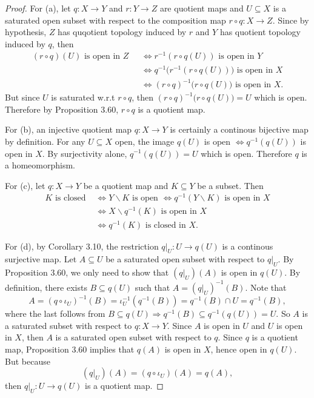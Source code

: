 \documentclass[a4paper]{article}
\theoremstyle{remark}
\newcommand{\subhim}{\subseteq} %
\begin{document}
\begin{proof}
	For (a), let $q : X \to Y$ and $r : Y \to Z$ are quotient maps and $U\subhim X$ is a saturated open subset with respect to the composition map $r \circ q : X\to Z$. Since by hypothesis, $Z$ has quqotient topology induced by $r$ and $Y$ has quotient topology induced by $q$, then
	\begin{align*}
	(r \circ q)(U) \text{ is open in $Z$ }&\Leftrightarrow r^{-1}(r \circ q(U)) \text{ is open in $Y$ }\\
	&\Leftrightarrow q^{-1}\big( r^{-1}(r \circ q(U)) \big) \text{ is open in $X$} \\
	&\Leftrightarrow (r \circ q)^{-1}\big(r \circ q(U)\big) \text{ is open in }X.
	\end{align*} 
	But since $U$ is saturated w.r.t $r \circ q$, then $(r \circ q)^{-1}\big(r \circ q(U)\big) = U$ which is open. Therefore by Proposition 3.60, $r \circ q$ is a quotient map.
	
	For (b), an injective quotient map $q : X \to Y$ is certainly a continous bijective map by definition. For any $U \subhim X$ open, the image $q(U)$ is open $\Leftrightarrow q^{-1}(q(U))$ is open in $X$. By surjectivity alone, $q^{-1}(q(U)) = U$ which is open. Therefore $q$ is a homeomorphism.
	
	For (c), let $q: X \to Y$ be a quotient map and $K \subhim Y$ be a subset. Then
	\begin{align*}
	K \text{ is closed } &\Leftrightarrow Y\smallsetminus K \text{ is open } \Leftrightarrow q^{-1}(Y \smallsetminus K) \text{ is open in }X \\ &\Leftrightarrow X\smallsetminus q^{-1}(K) \text{ is open in }X \\&\Leftrightarrow q^{-1}(K) \text{ is closed in }X.
	\end{align*}
	
	For (d), by Corollary 3.10, the restriction $q|_U : U \to q(U)$ is a continous surjective map. Let $A\subhim U$ be a saturated open subset with respect to $q|_U$. By Proposition 3.60, we only need to show that $(q|_U)(A)$ is open in $q(U)$. By definition, there exists $B \subhim q(U)$ such that $A = (q|_U)^{-1}(B)$. Note that
	$$
	A = (q \circ \iota_U)^{-1}(B) = \iota_U^{-1}(q^{-1}(B)) = q^{-1}(B) \cap U = q^{-1}(B), 
	$$  
	where the last follows from $B \subhim q(U) \Rightarrow q^{-1}(B) \subhim q^{-1}(q(U))=U$. So $A$ is a saturated subset with respect to $q: X \to Y$. Since $A$ is open in $U$ and $U$ is open in $X$, then $A$ is a saturated open subset with respect to $q$. Since $q$ is a quotient map, Proposition 3.60 implies that $q(A)$ is open in $X$, hence open in $q(U)$. But because
	$$
	(q|_U)(A) = (q \circ \iota_U)(A) = q(A),
	$$ 
	then $q|_U : U \to q(U)$ is a quotient map.
	

\end{proof}
\end{document}
